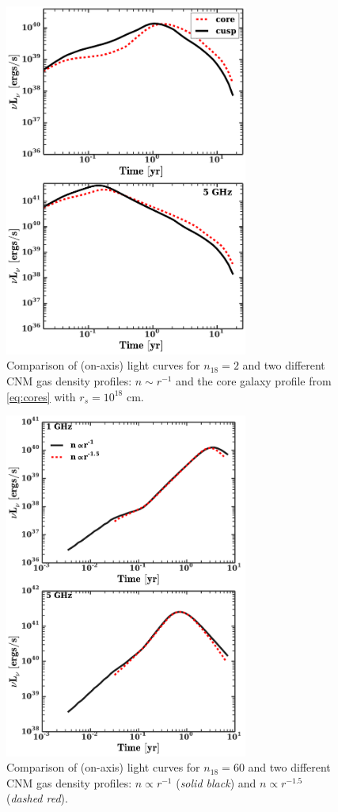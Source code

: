\documentclass[usenatbib,fleqn]{mnras}
\begin{document}
\begin{figure} 
  \includegraphics[width=8cm]{fig_cores.pdf}
  \caption{\label{fig:cores} Comparison of (on-axis) light curves for
    $n_{18}=2$ and two different CNM gas density profiles: $n\sim
    r^{-1}$ and the core galaxy profile from \eqref{eq:cores} with
    $r_s=10^{18}$ cm.}
\end{figure}


\begin{figure} 
  \includegraphics[width=8cm]{profs2.pdf}
  \caption{\label{fig:profs2} Comparison of (on-axis) light curves for
    $n_{18}=60$ and two different CNM gas density profiles: $n\propto
    r^{-1}$ ({\it solid black}) and $n\propto r^{-1.5}$ ({\it dashed
      red}).}
\end{figure}
\end{document}

